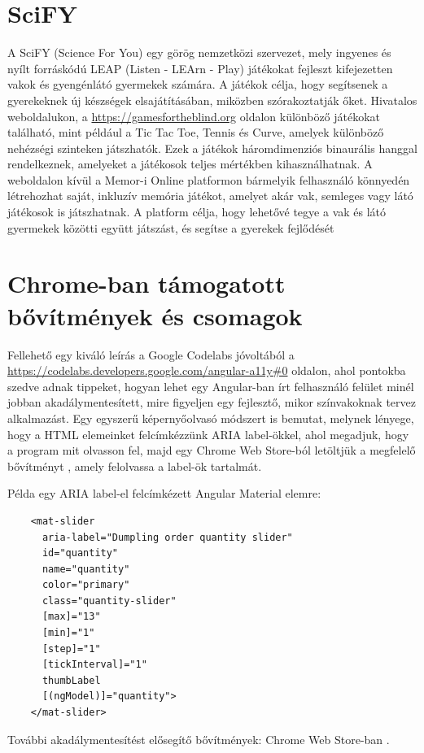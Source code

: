 \documentclass[12pt]{report}
\begin{document}
\section{SciFY}
A SciFY (Science For You) \cite{scify} egy görög nemzetközi szervezet, mely ingyenes és nyílt forráskódú LEAP (Listen - LEArn - Play) játékokat fejleszt kifejezetten vakok és gyengénlátó gyermekek számára. A játékok célja, hogy segítsenek a gyerekeknek új készségek elsajátításában, miközben szórakoztatják őket. Hivatalos weboldalukon, a \linebreak \url{https://gamesfortheblind.org} oldalon különböző játékokat található, mint például a Tic Tac Toe, Tennis és Curve, amelyek különböző nehézségi szinteken játszhatók. Ezek a játékok háromdimenziós binaurális hanggal rendelkeznek, amelyeket a játékosok teljes mértékben kihasználhatnak. A weboldalon kívül a Memor-i Online platformon bármelyik felhasználó könnyedén létrehozhat saját, inkluzív memória játékot, amelyet akár vak, semleges vagy látó játékosok is játszhatnak. A platform célja, hogy lehetővé tegye a vak és látó gyermekek közötti együtt játszást, és segítse a gyerekek fejlődését

\section{Chrome-ban támogatott bővítmények és csomagok}
Fellehető egy kiváló leírás a Google Codelabs jóvoltából a \linebreak \url{https://codelabs.developers.google.com/angular-a11y#0} oldalon, ahol pontokba szedve adnak tippeket, hogyan lehet egy Angular-ban írt felhasználó felület minél jobban akadálymentesített, mire figyeljen egy fejlesztő, mikor színvakoknak tervez alkalmazást. Egy egyszerű képernyőolvasó módszert is bemutat, melynek lényege, hogy a HTML elemeinket felcímkézzünk ARIA label-ökkel, ahol megadjuk, hogy a program mit olvasson fel, majd egy Chrome Web Store-ból letöltjük a megfelelő bővítményt \cite{chromevox}, amely felolvassa a label-ök tartalmát.

\pagebreak
Példa egy ARIA label-el felcímkézett Angular Material elemre\cite{ariaex}:

\begin{verbatim}
    <mat-slider
      aria-label="Dumpling order quantity slider"
      id="quantity"
      name="quantity"
      color="primary"
      class="quantity-slider"
      [max]="13"
      [min]="1"
      [step]="1"
      [tickInterval]="1"
      thumbLabel
      [(ngModel)]="quantity">
    </mat-slider>
\end{verbatim}
\newline
További akadálymentesítést elősegítő bővítmények: Chrome Web Store-ban \cite{extensions}.
\end{document}
